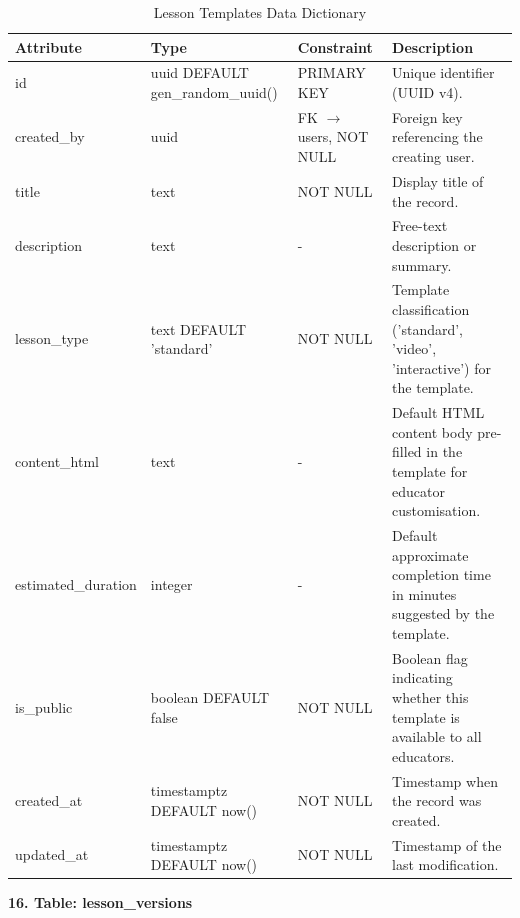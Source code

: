\documentclass[12pt, oneside]{article} %
\newcommand{\tabbreak}{\hyphenpenalty=200\exhyphenpenalty=200\tolerance=4000\hbadness=10000\hspace{0pt}}
\begin{document}
\begin{table}[H]
\caption{Lesson Templates Data Dictionary}
\label{tab:dd_lesson_templates}
\vspace{-4mm}
\begin{center}
\renewcommand{\arraystretch}{1.15}
\scriptsize
\begin{tabular}{|>{\raggedright\arraybackslash\tabbreak}p{2.67cm}|>{\raggedright\arraybackslash\tabbreak}p{2.93cm}|>{\raggedright\arraybackslash\tabbreak}p{2.67cm}|>{\raggedright\arraybackslash\tabbreak}p{4.51cm}|}
\hline
\textbf{Attribute} & \textbf{Type} & \textbf{Constraint} & \textbf{Description} \\ \hline
id & uuid DEFAULT gen\_random\_uuid() & PRIMARY KEY & Unique identifier (UUID v4). \\ \hline
created\_by & uuid & FK $\rightarrow$ users, NOT NULL & Foreign key referencing the creating user. \\ \hline
title & text & NOT NULL & Display title of the record. \\ \hline
description & text & - & Free-text description or summary. \\ \hline
lesson\_type & text DEFAULT 'standard' & NOT NULL & Template classification ('standard', 'video', 'interactive') for the template. \\ \hline
content\_html & text & - & Default HTML content body pre-filled in the template for educator customisation. \\ \hline
estimated\_duration & integer & - & Default approximate completion time in minutes suggested by the template. \\ \hline
is\_public & boolean DEFAULT false & NOT NULL & Boolean flag indicating whether this template is available to all educators. \\ \hline
created\_at & timestamptz DEFAULT now() & NOT NULL & Timestamp when the record was created. \\ \hline
updated\_at & timestamptz DEFAULT now() & NOT NULL & Timestamp of the last modification. \\ \hline
\end{tabular}
\end{center}
\end{table}

\textbf{16. Table: lesson\_versions}
\end{document}
